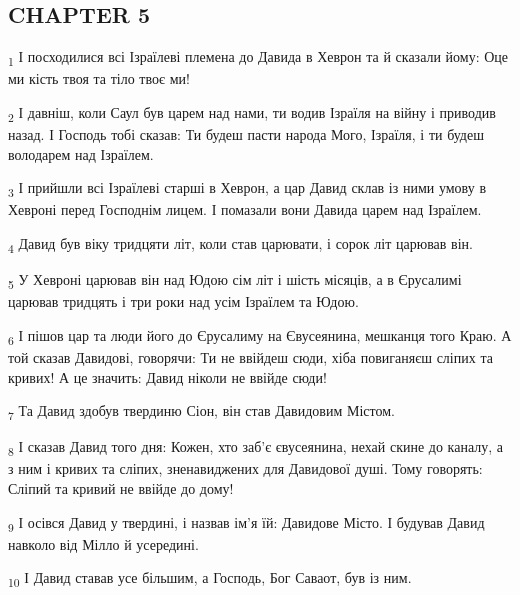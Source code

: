 \subsection{CHAPTER 5}
\begin{tcolorbox}
\textsubscript{1} І посходилися всі Ізраїлеві племена до Давида в Хеврон та й сказали йому: Оце ми кість твоя та тіло твоє ми!
\end{tcolorbox}
\begin{tcolorbox}
\textsubscript{2} І давніш, коли Саул був царем над нами, ти водив Ізраїля на війну і приводив назад. І Господь тобі сказав: Ти будеш пасти народа Мого, Ізраїля, і ти будеш володарем над Ізраїлем.
\end{tcolorbox}
\begin{tcolorbox}
\textsubscript{3} І прийшли всі Ізраїлеві старші в Хеврон, а цар Давид склав із ними умову в Хевроні перед Господнім лицем. І помазали вони Давида царем над Ізраїлем.
\end{tcolorbox}
\begin{tcolorbox}
\textsubscript{4} Давид був віку тридцяти літ, коли став царювати, і сорок літ царював він.
\end{tcolorbox}
\begin{tcolorbox}
\textsubscript{5} У Хевроні царював він над Юдою сім літ і шість місяців, а в Єрусалимі царював тридцять і три роки над усім Ізраїлем та Юдою.
\end{tcolorbox}
\begin{tcolorbox}
\textsubscript{6} І пішов цар та люди його до Єрусалиму на Євусеянина, мешканця того Краю. А той сказав Давидові, говорячи: Ти не ввійдеш сюди, хіба повиганяєш сліпих та кривих! А це значить: Давид ніколи не ввійде сюди!
\end{tcolorbox}
\begin{tcolorbox}
\textsubscript{7} Та Давид здобув твердиню Сіон, він став Давидовим Містом.
\end{tcolorbox}
\begin{tcolorbox}
\textsubscript{8} І сказав Давид того дня: Кожен, хто заб'є євусеянина, нехай скине до каналу, а з ним і кривих та сліпих, зненавиджених для Давидової душі. Тому говорять: Сліпий та кривий не ввійде до дому!
\end{tcolorbox}
\begin{tcolorbox}
\textsubscript{9} І осівся Давид у твердині, і назвав ім'я їй: Давидове Місто. І будував Давид навколо від Мілло й усередині.
\end{tcolorbox}
\begin{tcolorbox}
\textsubscript{10} І Давид ставав усе більшим, а Господь, Бог Саваот, був із ним.
\end{tcolorbox}
